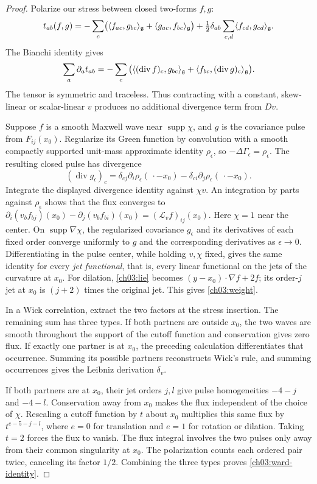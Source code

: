 \begin{proof}
Polarize our stress between closed two-forms $f,g$:
\[
 t_{ab}(f,g)=-\sum_c\bigl(\langle f_{ac},g_{bc}\rangle_{\mathfrak g}+\langle g_{ac},f_{bc}\rangle_{\mathfrak g}\bigr)
             +\tfrac12\delta_{ab}\sum_{c,d}\langle f_{cd},g_{cd}\rangle_{\mathfrak g}.
\]
The Bianchi identity gives
\[
 \sum_a\partial_at_{ab}
 =-\sum_c\big(\langle (\operatorname{div}f)_c,g_{bc}\rangle_{\mathfrak g}
                         +\langle f_{bc},(\operatorname{div}g)_c\rangle_{\mathfrak g}\big).
\]
The tensor is symmetric and traceless. Thus contracting with a constant,
skew-linear or scalar-linear $v$ produces no additional divergence term
from $Dv$.

Suppose $f$ is a smooth Maxwell wave near $\operatorname{supp}\chi$,
and $g$ is the covariance pulse from $F_{ij}(x_0)$. Regularize its Green
function by convolution with a smooth compactly supported unit-mass
approximate identity $\rho_\epsilon$, so
$-\Delta\Gamma_\epsilon=\rho_\epsilon$.
The resulting closed pulse has divergence
\[
 (\operatorname{div}g_\epsilon)_c
   =\delta_{cj}\partial_i\rho_\epsilon(\,\cdot-x_0)
       -\delta_{ci}\partial_j\rho_\epsilon(\,\cdot-x_0).
\]
Integrate the displayed divergence identity against $\chi v$.
An integration by parts against $\rho_\epsilon$ shows that the flux
converges to
$\partial_i(v_bf_{bj})(x_0)-\partial_j(v_bf_{bi})(x_0)
=(\mathcal L_vf)_{ij}(x_0)$.
Here $\chi=1$ near the center. On $\operatorname{supp}\nabla\chi$,
the regularized covariance $g_\epsilon$ and its derivatives of each fixed
order converge uniformly to $g$ and the corresponding derivatives as
$\epsilon\to0$. Differentiating in the pulse center, while
holding $v,\chi$ fixed, gives the same identity for every \emph{jet functional}, that is, every linear functional on the jets of the curvature at $x_0$.
For dilation, \eqref{ch03:lie} becomes
$(y-x_0)\cdot\nabla f+2f$; its order-$j$ jet at $x_0$ is
$(j+2)$ times the original jet. This gives \eqref{ch03:weight}.

In a Wick correlation, extract the two factors at the stress insertion.
The remaining sum has three types. If both partners are outside $x_0$,
the two waves are smooth throughout the support of the cutoff function and conservation
gives zero flux. If exactly one partner is at $x_0$, the preceding
calculation differentiates that occurrence. Summing its possible
partners reconstructs Wick's rule, and summing occurrences gives the
Leibniz derivation $\delta_v$.

If both partners are at $x_0$, their jet orders $j,l$ give pulse
homogeneities $-4-j$ and $-4-l$. Conservation away from $x_0$ makes
the flux independent of the choice of $\chi$. Rescaling a cutoff function by $t$
about $x_0$ multiplies this same flux by $t^{e-5-j-l}$, where
$e=0$ for translation and $e=1$ for rotation or dilation.
Taking $t=2$ forces the flux to vanish. The flux integral involves the two
pulses only away from their common singularity at $x_0$.
The polarization counts each ordered pair twice, canceling its factor
$1/2$. Combining the three types proves \eqref{ch03:ward-identity}.
\end{proof}


